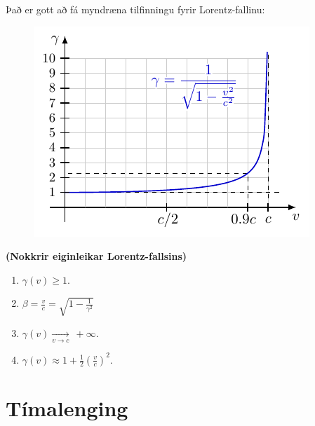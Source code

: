 Það er gott að fá myndræna tilfinningu fyrir Lorentz-fallinu:

\begin{figure}[H]
    \centering
    \includegraphics[width=.35\textwidth]{figures/gamma1.pdf}
\end{figure}


\begin{tcolorbox}
\begin{theorem}
\textbf{(Nokkrir eiginleikar Lorentz-fallsins)} 
\begin{enumerate}[label = \textbf{(\alph*)}]
    \item $\gamma(v) \geq 1$.
    \item $\beta = \frac{v}{c} = \sqrt{1 - \frac{1}{\gamma^2}}$
    \item $\gamma(v) \xrightarrow[v \to c]{}\ +\infty$.
    \item $\gamma(v) \approx 1 + \frac{1}{2}\left(\frac{v}{c}\right)^2$.
\end{enumerate}
\end{theorem}
\end{tcolorbox}


\section{Tímalenging}


